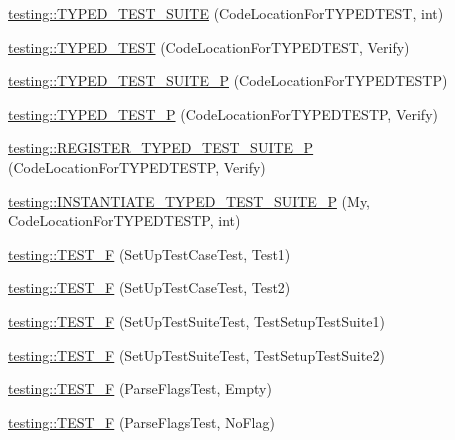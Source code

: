 \begin{DoxyCompactItemize}
\mbox{\hyperlink{namespacetesting_a47a357ed1077c1b52ba654b7753714bc}{testing\+::\+T\+Y\+P\+E\+D\+\_\+\+T\+E\+S\+T\+\_\+\+S\+U\+I\+TE}} (Code\+Location\+For\+T\+Y\+P\+E\+D\+T\+E\+ST, int)
\item 
\mbox{\hyperlink{namespacetesting_a400c572f732b06e836d6b3a5adfc4cf7}{testing\+::\+T\+Y\+P\+E\+D\+\_\+\+T\+E\+ST}} (Code\+Location\+For\+T\+Y\+P\+E\+D\+T\+E\+ST, Verify)
\item 
\mbox{\hyperlink{namespacetesting_ab6095d387aee3b6b71919177827e78f5}{testing\+::\+T\+Y\+P\+E\+D\+\_\+\+T\+E\+S\+T\+\_\+\+S\+U\+I\+T\+E\+\_\+P}} (Code\+Location\+For\+T\+Y\+P\+E\+D\+T\+E\+S\+TP)
\item 
\mbox{\hyperlink{namespacetesting_a3f3fbbc7ecc23117307b81deb8f4cfac}{testing\+::\+T\+Y\+P\+E\+D\+\_\+\+T\+E\+S\+T\+\_\+P}} (Code\+Location\+For\+T\+Y\+P\+E\+D\+T\+E\+S\+TP, Verify)
\item 
\mbox{\hyperlink{namespacetesting_ac025be5150f4d250cfd8136063e2f2a1}{testing\+::\+R\+E\+G\+I\+S\+T\+E\+R\+\_\+\+T\+Y\+P\+E\+D\+\_\+\+T\+E\+S\+T\+\_\+\+S\+U\+I\+T\+E\+\_\+P}} (Code\+Location\+For\+T\+Y\+P\+E\+D\+T\+E\+S\+TP, Verify)
\item 
\mbox{\hyperlink{namespacetesting_abc73aa914fde88c645367f862dbe81dd}{testing\+::\+I\+N\+S\+T\+A\+N\+T\+I\+A\+T\+E\+\_\+\+T\+Y\+P\+E\+D\+\_\+\+T\+E\+S\+T\+\_\+\+S\+U\+I\+T\+E\+\_\+P}} (My, Code\+Location\+For\+T\+Y\+P\+E\+D\+T\+E\+S\+TP, int)
\item 
\mbox{\hyperlink{namespacetesting_a01e948eb5427d31f70eafaf472e2bfa8}{testing\+::\+T\+E\+S\+T\+\_\+F}} (Set\+Up\+Test\+Case\+Test, Test1)
\item 
\mbox{\hyperlink{namespacetesting_a8fc2e448ce96e4da357a2129d49e86e3}{testing\+::\+T\+E\+S\+T\+\_\+F}} (Set\+Up\+Test\+Case\+Test, Test2)
\item 
\mbox{\hyperlink{namespacetesting_a071d841c6f97de4f9fd502ed3c24c017}{testing\+::\+T\+E\+S\+T\+\_\+F}} (Set\+Up\+Test\+Suite\+Test, Test\+Setup\+Test\+Suite1)
\item 
\mbox{\hyperlink{namespacetesting_a505d03ad8946d9a4598f8a6754bd2172}{testing\+::\+T\+E\+S\+T\+\_\+F}} (Set\+Up\+Test\+Suite\+Test, Test\+Setup\+Test\+Suite2)
\item 
\mbox{\hyperlink{namespacetesting_a9072b690c3c0e3b6af327fa72fe821c4}{testing\+::\+T\+E\+S\+T\+\_\+F}} (Parse\+Flags\+Test, Empty)
\item 
\mbox{\hyperlink{namespacetesting_ab2b5d94a0dd45cb06473bdd7900e23af}{testing\+::\+T\+E\+S\+T\+\_\+F}} (Parse\+Flags\+Test, No\+Flag)
\item 

\end{DoxyCompactItemize}
